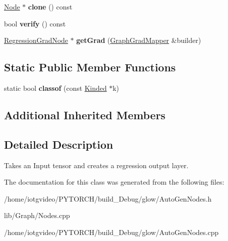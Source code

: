 \begin{DoxyCompactItemize}
\mbox{\label{classglow_1_1_regression_node_ace93d9ff33c3b8c4ea36e186962d37c6}} 
\hyperlink{classglow_1_1_node}{Node} $\ast$ {\bfseries clone} () const
\item 
\mbox{\label{classglow_1_1_regression_node_a0be2ae96959a2b66a37278b8f359e111}} 
bool {\bfseries verify} () const
\item 
\mbox{\label{classglow_1_1_regression_node_aefc2539fe6b03410d75ed91beb016315}} 
\hyperlink{classglow_1_1_regression_grad_node}{Regression\+Grad\+Node} $\ast$ {\bfseries get\+Grad} (\hyperlink{classglow_1_1_graph_grad_mapper}{Graph\+Grad\+Mapper} \&builder)
\end{DoxyCompactItemize}
\subsection*{Static Public Member Functions}
\begin{DoxyCompactItemize}
\item 
\mbox{\label{classglow_1_1_regression_node_ac225622693885f81248c902d72f00f7f}} 
static bool {\bfseries classof} (const \hyperlink{classglow_1_1_kinded}{Kinded} $\ast$k)
\end{DoxyCompactItemize}
\subsection*{Additional Inherited Members}


\subsection{Detailed Description}
Takes an Input tensor and creates a regression output layer. 

The documentation for this class was generated from the following files\+:\begin{DoxyCompactItemize}
\item 
/home/iotgvideo/\+P\+Y\+T\+O\+R\+C\+H/build\+\_\+\+Debug/glow/Auto\+Gen\+Nodes.\+h\item 
lib/\+Graph/Nodes.\+cpp\item 
/home/iotgvideo/\+P\+Y\+T\+O\+R\+C\+H/build\+\_\+\+Debug/glow/Auto\+Gen\+Nodes.\+cpp\end{DoxyCompactItemize}
